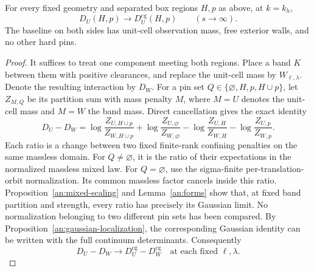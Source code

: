 \begin{proposition}\label{an:pin-interaction}
For every fixed geometry and separated box regions $H,p$
as above, at $k=k_h$,
\begin{equation}
 D_U(H,p)\longrightarrow D_U^{\mathrm{cg}}(H,p)
 \qquad(s\to\infty).
 \label{an:full-pin-limit}
\end{equation}
The baseline on both sides has unit-cell observation mass,
free exterior walls, and no other hard pins.
\end{proposition}

\begin{proof}
It suffices to treat one component meeting both regions.
Place a band $K$ between them with positive clearances,
and replace the unit-cell mass by
$W_{\ell,\lambda}$.  Denote the resulting interaction
by $D_W$.  For a pin set
$Q\in\{\varnothing,H,p,H\cup p\}$, let $Z_{M,Q}$
be its partition sum with mass penalty $M$, where
$M=U$ denotes the unit-cell mass and $M=W$ the
band mass.  Direct cancellation gives the exact identity
\begin{equation}
 D_U-D_W=
 \log\frac{Z_{U,H\cup p}}{Z_{W,H\cup p}}
 +\log\frac{Z_{U,\varnothing}}{Z_{W,\varnothing}}
 -\log\frac{Z_{U,H}}{Z_{W,H}}
 -\log\frac{Z_{U,p}}{Z_{W,p}}.
 \label{an:four-mass-ratios}
\end{equation}
Each ratio is a change between two fixed finite-rank
confining penalties on the same massless domain.
For $Q\ne\varnothing$, it is the ratio of their
expectations in the normalized massless mixed law.
For $Q=\varnothing$, use the sigma-finite
per-translation-orbit normalization.  Its common
massless factor cancels inside this ratio.
Proposition~\ref{an:mixed-scaling} and
Lemma~\ref{an:forms} show that, at fixed band
partition and strength, every ratio has precisely
its Gaussian limit.  No normalization belonging
to two different pin sets has been compared.
By Proposition~\ref{an:gaussian-localization},
the corresponding Gaussian identity can be
written with the full continuum determinants.
Consequently
\begin{equation}
 D_U-D_W\longrightarrow
       D_U^{\mathrm{cg}}-D_W^{\mathrm{cg}}
 \quad\text{at each fixed }\ell,\lambda.
 \label{an:interaction-difference}
\end{equation}


\end{proof}
